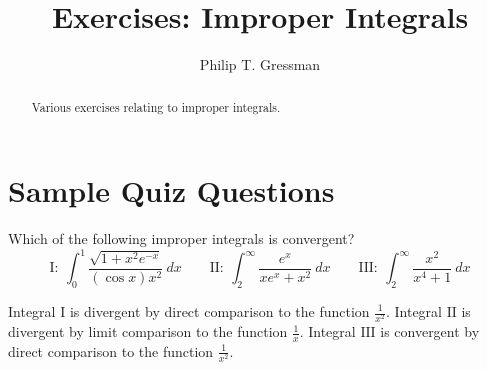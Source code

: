 \documentclass{ximera}
\title{Exercises: Improper Integrals}
\author{Philip T. Gressman}
\begin{document}
\begin{abstract}
Various exercises relating to improper integrals.
\end{abstract}
\maketitle


\section*{Sample Quiz Questions}

\begin{question}%

Which of the following improper integrals is convergent? 
\[ \mathrm{I}: \ \int_0^1\frac{\sqrt{{1}+{x^2}{e^{-x}}}}{{(\cos x)}{x^2}}~dx \qquad   \mathrm{II}: \ \int_{2}^\infty\frac{{e^{x}}}{{x}{e^{x}}+{x^2}}~dx \qquad  \mathrm{III}: \ \int_{2}^\infty\frac{{x^2}}{{x^4}+{1}}~dx\]
\begin{multiplechoice}
\end{multiplechoice}
\begin{feedback}
Integral \(\mathrm{I}\) is divergent by direct comparison to the function \(\displaystyle \frac{{1}}{{x^2}}\). 
Integral \(\mathrm{II}\) is divergent by limit comparison to the function \(\displaystyle \frac{{1}}{{x}}\). 
Integral \(\mathrm{III}\) is convergent by direct comparison to the function \(\displaystyle \frac{{1}}{{x^2}}\).
\end{feedback}

\end{question}
\end{document}
